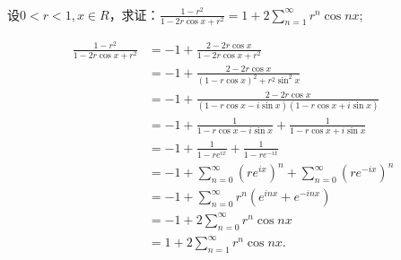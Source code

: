   \begin{exercise}
  \hfill\\
   设$0<r<1,x\in R$，求证：$\displaystyle\frac{1-r^2}{1-2r\cos x+r^2}=1+2\sum_{n=1}^{\infty}r^n\cos nx$; 
  

\begin{align*}
\frac{1-r^2}{1-2r\cos x+r^2}&=-1+\frac{2-2r\cos x}{1-2r\cos x+r^2}\\
&=-1+\frac{2-2r\cos x}{(1-r\cos x)^2+r^2\sin^2x}\\
&=-1+\frac{2-2r\cos x}{(1-r\cos x-i\sin x)(1-r\cos x+i\sin x)}\\
&=-1+\frac{1}{1-r\cos x-i\sin x}+\frac{1}{1-r\cos x+i\sin x}\\
&=-1+\frac{1}{1-re^{ix}}+\frac{1}{1-re^{-ix}}\\
&=-1+\sum_{n=0}^{\infty}(re^{ix})^n+\sum_{n=0}^{\infty}(re^{-ix})^n\\
&=-1+\sum_{n=0}^{\infty}r^n(e^{inx}+e^{-inx})\\
&=-1+2\sum_{n=0}^{\infty}r^n\cos nx\\
&=1+2\sum_{n=1}^{\infty}r^n\cos nx.\\
\end{align*}

  \end{exercise}
